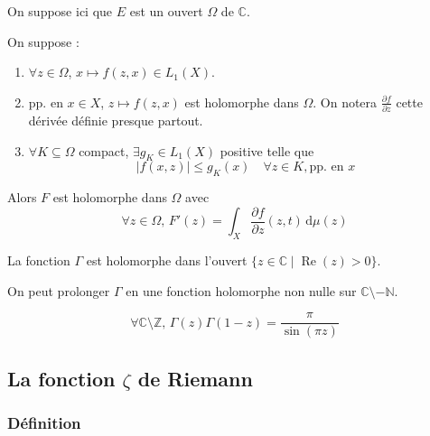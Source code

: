   On suppose ici que $E$ est un ouvert $\Omega$ de $\mathbb{C}$.

  \begin{theorem}
    On suppose :
    \begin{enumerate}[label=(\roman*)]
      \item $\forall z \in \Omega$, $x \mapsto f(z,x) \in L_1(X)$.
      \item pp. en $x \in X$, $z \mapsto f(z,x)$ est holomorphe dans $\Omega$. On notera $\frac{\partial f}{\partial z}$ cette dérivée définie presque partout.
      \item $\forall K \subseteq \Omega$ compact, $\exists g_K \in L_1(X)$ positive telle que
      \[ \left| f(x,z) \right| \leq g_K(x) \quad \forall z \in K, \text{pp. en } x \]
    \end{enumerate}
    Alors $F$ est holomorphe dans $\Omega$ avec
    \[ \forall z \in \Omega, \, F'(z) = \int_X \frac{\partial f}{\partial z}(z, t) \, \mathrm{d}\mu(z) \]
  \end{theorem}


  \begin{example}
    La fonction $\Gamma$ est holomorphe dans l'ouvert $\{ z \in \mathbb{C} \mid \operatorname{Re}(z) > 0 \}$.
  \end{example}

  \begin{theorem}
    On peut prolonger $\Gamma$ en une fonction holomorphe non nulle sur $\mathbb{C} \setminus -\mathbb{N}$.
  \end{theorem}


  \begin{theorem}
    \[ \forall \mathbb{C} \setminus \mathbb{Z}, \, \Gamma(z) \Gamma(1-z) = \frac{\pi}{\sin(\pi z)} \]
  \end{theorem}

  \subsection{La fonction \texorpdfstring{$\zeta$}{Zeta} de Riemann}

  \subsubsection{Définition}


